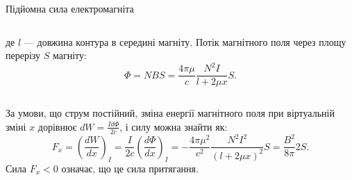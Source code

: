 \documentclass[onlytextwidth]{beamer}
\begin{document}
\begin{frame}{Підйомна сила електромагніта}{}
\begin{columns}
\begin{column}{0.75\linewidth}
\begin{block}{}
				де $l$ --- довжина контура в середині магніту.
				Потік магнітного поля через площу перерізу $S$ магніту:
				\begin{equation*}
					\Phi = NBS = \frac{4\pi\mu}{c} \frac{N^2I}{l + 2\mu x} S.
				\end{equation*}
			\end{block}
		\end{column}
	\end{columns}
	\begin{block}{}\justifying
		За умови, що струм постійний, зміна енергії магнітного поля при віртуальній зміні $x$ дорівнює $dW = \frac{I d\Phi}{2c}$,
		і силу можна знайти як:
		\begin{equation*}
			F_x =  \left( \frac{d W}{dx} \right)_{I} = \frac{I}{2c} \left( \frac{d \Phi}{dx} \right)_{I} = -\frac{4\pi\mu^2}{c^2}\frac{N^2I^2}{(l + 2\mu
				x)^2} S = \frac{B^2}{8\pi} 2S.
		\end{equation*}Сила $F_x <0 $ означає, що це сила притягання.
	\end{block}
\end{frame}
\end{document}
